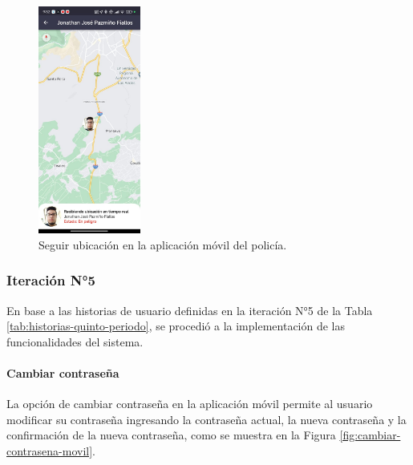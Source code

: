 \begin{figure}[H]
    \centering
    \includegraphics[width=0.3\textwidth]{chapters/III-resultados-y-discusion/resources/images/seguir-ubicacion-policia.png}
    \caption{Seguir ubicación en la aplicación móvil del policía.}
    \label{fig:seguir-ubicacion-movil-policia}
\end{figure}

\subsubsection{Iteración N°5}

En base a las historias de usuario definidas en la iteración N°5 de la Tabla \ref{tab:historias-quinto-periodo}, se procedió a la implementación
de las funcionalidades del sistema.

\paragraph{Cambiar contraseña}
La opción de cambiar contraseña en la aplicación móvil permite al usuario modificar su contraseña ingresando la contraseña actual,
la nueva contraseña y la confirmación de la nueva contraseña, como se muestra en la Figura \ref{fig:cambiar-contrasena-movil}.

